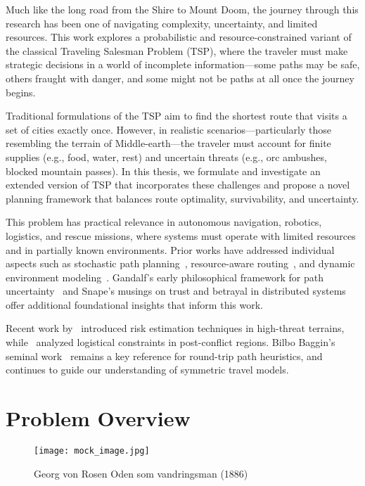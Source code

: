\documentclass[main.tex]{subfiles}
\begin{document}
\noindent
Much like the long road from the Shire to Mount Doom, the journey through this research has been one of navigating complexity, uncertainty, and limited resources. This work explores a probabilistic and resource-constrained variant of the classical Traveling Salesman Problem (TSP), where the traveler must make strategic decisions in a world of incomplete information—some paths may be safe, others fraught with danger, and some might not be paths at all once the journey begins.

Traditional formulations of the TSP aim to find the shortest route that visits a set of cities exactly once. However, in realistic scenarios—particularly those resembling the terrain of Middle-earth—the traveler must account for finite supplies (e.g., food, water, rest) and uncertain threats (e.g., orc ambushes, blocked mountain passes). In this thesis, we formulate and investigate an extended version of TSP that incorporates these challenges and propose a novel planning framework that balances route optimality, survivability, and uncertainty.

This problem has practical relevance in autonomous navigation, robotics, logistics, and rescue missions, where systems must operate with limited resources and in partially known environments. Prior works have addressed individual aspects such as stochastic path planning~\cite{potter2010}, resource-aware routing~\cite{aslan2008}, and dynamic environment modeling~\cite{legolas2016}. Gandalf's early philosophical framework for path uncertainty~\cite{gandalf2003} and Snape's musings on trust and betrayal in distributed systems~\cite{snape2015} offer additional foundational insights that inform this work.

Recent work by~\textcite{baggins2027} introduced risk estimation techniques in high-threat terrains, while~\textcite{merry2020} analyzed logistical constraints in post-conflict regions. Bilbo Baggin's seminal work~\cite{bilbo1999} remains a key reference for round-trip path heuristics, and continues to guide our understanding of symmetric travel models.

\section{Problem Overview}\label{sec:introduction:section}

\begin{figure}[htbp]
    \centering
    \texttt{[image: mock\_image.jpg]}
    \caption{Georg von Rosen \- Oden som vandringsman (1886)}\label{fig:middleearth-path}
\end{figure}
\end{document}
